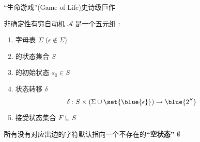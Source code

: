 \begin{frame}{}
  \begin{center}

    \vspace{0.80cm}
    ``生命游戏''(Game of Life)史诗级巨作 \\[8pt]
  \end{center}
\end{frame}

\begin{frame}{}
  \begin{center}

    \vspace{0.30cm}

    \vspace{0.50cm}
  \end{center}
\end{frame}

\begin{frame}{}
  \begin{definition}
    非确定性有穷自动机 $\mathcal{A}$ 是一个五元组 
    :

    \vspace{0.30cm}
    \begin{enumerate}[(1)]
      \item 字母表 $\Sigma$ ($\epsilon \notin \Sigma$)
      \item {}的状态集合 $S$
      \item {}的初始状态 $s_{0} \in S$
      \item 状态转移 $\delta$
        \[
          \delta: S \times (\Sigma \cup \set{\blue{\epsilon}}) \to \blue{2^{S}}
        \]
      \item 接受状态集合 $F \subseteq S$
    \end{enumerate}
  \end{definition}


  \pause
  \begin{center}
     所有没有对应出边的字符默认指向一个不存在的{\bf ``空状态'' $\emptyset$}
  \end{center}
\end{frame}

